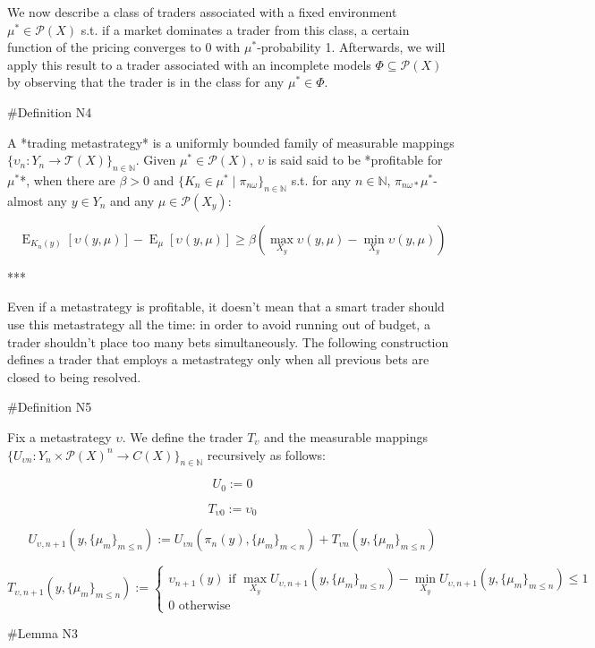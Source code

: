 \documentclass[a4paper]{article}
\DeclareMathOperator{\E}{E}
\newcommand{\Nats}{\mathbb{N}}
\newcommand{\Prob}{\mathcal{P}}
\newcommand{\T}{\mathcal{T}}
\begin{document}
We now describe a class of traders associated with a fixed environment ${\mu^* \in \Prob(X)}$ s.t. if a market dominates a trader from this class, a certain function of the pricing converges to 0 with ${\mu^*}$-probability 1. Afterwards, we will apply this result to a trader associated with an incomplete models ${\Phi \subseteq \Prob(X)}$ by observing that the trader is in the class for any ${\mu^* \in \Phi}$.

\#Definition N4

A *trading metastrategy* is a uniformly bounded family of measurable mappings ${\{\upsilon_n: Y_n \rightarrow \T(X)\}_{n \in \Nats}}$. Given ${\mu^* \in \Prob(X)}$, ${\upsilon}$ is said said to be *profitable for ${\mu^*}$*, when there are ${\beta > 0}$ and ${\{K_n \in \mu^* \mid \pi_{n\omega}\}_{n \in \Nats}}$ s.t. for any ${n \in \Nats}$, ${\pi_{n\omega*}\mu^*}$-almost any ${y \in Y_n}$ and any ${\mu \in \Prob(X_y)}$:

$$\E_{K_n(y)}[\upsilon(y,\mu)] - \E_{\mu}[\upsilon(y,\mu)] \geq \beta (\max_{X_y} \upsilon(y,\mu) - \min_{X_y} \upsilon(y,\mu))$$

***

Even if a metastrategy is profitable, it doesn't mean that a smart trader should use this metastrategy all the time: in order to avoid running out of budget, a trader shouldn't place too many bets simultaneously. The following construction defines a trader that employs a metastrategy only when all previous bets are closed to being resolved.

\#Definition N5

Fix a metastrategy ${\upsilon}$. We define the trader ${T_\upsilon}$ and the measurable mappings ${\{U_{\upsilon  n}: Y_n \times \Prob(X)^n \rightarrow C(X)\}_{n \in \Nats}}$ recursively as follows:
 
 $$U_0 := 0$$

$$T_{\upsilon0} := \upsilon_0$$

$$U_{\upsilon,n+1}(y, \{\mu_m\}_{m \leq n}) := U_{\upsilon n}(\pi_n(y), \{\mu_m\}_{m < n}) + T_{\upsilon n}(y, \{\mu_m\}_{m \leq n})$$

$$T_{\upsilon,n+1}(y, \{\mu_m\}_{m \leq n}) := \begin{cases}\upsilon_{n+1}(y) \text{ if } \max_{X_y} U_{\upsilon,n+1}(y,\{\mu_m\}_{m \leq n}) - \min_{X_y} U_{\upsilon,n+1}(y,\{\mu_m\}_{m \leq n})\leq 1\\0 \text{ otherwise}\end{cases}$$

\#Lemma N3
\end{document}

